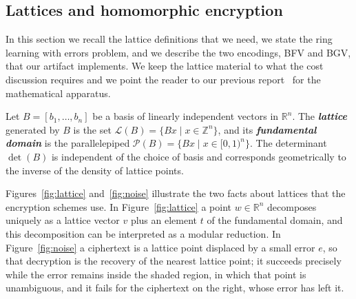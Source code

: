 \documentclass[11pt]{article}
\newcommand{\ib}[1]{\textbf{\emph{#1}}}
\newcommand{\Z}{\mathbb{Z}}
\begin{document}
\subsection{Lattices and homomorphic encryption}
\label{sec:prelim:fhe}

In this section we recall the lattice definitions that we need, we state the ring learning
with errors problem, and we describe the two encodings, BFV and BGV, that our artifact
implements. We keep the lattice material to what the cost discussion requires and we point
the reader to our previous report~\cite{MoraisDahab} for the mathematical apparatus.

\begin{definition}
\label{def:lattice}
Let $B = [b_1,\dots,b_n]$ be a basis of linearly independent vectors in $\mathbb{R}^n$. The
\ib{lattice} generated by $B$ is the set $\mathcal{L}(B) = \{Bx \mid x \in \Z^n\}$, and
its \ib{fundamental domain} is the parallelepiped
$\mathcal{P}(B) = \{Bx \mid x \in [0,1)^n\}$. The determinant $\det(B)$ is independent of the
choice of basis and corresponds geometrically to the inverse of the density of lattice points.
\end{definition}

Figures~\ref{fig:lattice} and~\ref{fig:noise} illustrate the two facts about lattices that
the encryption schemes use. In Figure~\ref{fig:lattice} a point $w \in \mathbb{R}^n$
decomposes uniquely as a lattice vector $v$ plus an element $t$ of the fundamental domain, and
this decomposition can be interpreted as a modular reduction. In Figure~\ref{fig:noise} a
ciphertext is a lattice point displaced by a small error $e$, so that decryption is the
recovery of the nearest lattice point; it succeeds precisely while the error remains inside
the shaded region, in which that point is unambiguous, and it fails for the ciphertext on the
right, whose error has left it.
\end{document}
